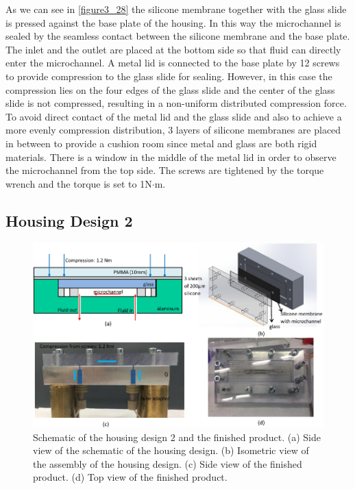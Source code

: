 As we can see in \autoref{figure3_28} the silicone membrane together with the glass slide is pressed against the base plate of the housing. In this way the microchannel is sealed by the seamless contact between the silicone membrane and the base plate. The inlet and the outlet are placed at the bottom side so that fluid can directly enter the microchannel. A metal lid is connected to the base plate by 12 screws to provide compression to the glass slide for sealing. However, in this case the compression lies on the four edges of the glass slide and the center of the glass slide is not compressed, resulting in a non-uniform distributed compression force. To avoid direct contact of the metal lid and the glass slide and also to achieve a more evenly compression distribution, 3 layers of silicone membranes are placed in between to provide a cushion room since metal and glass are both rigid materials. There is a window in the middle of the metal lid in order to observe the microchannel from the top side. The screws are tightened by the torque wrench and the torque is set to 1N$\cdot$m.

\subsection{Housing Design 2}
\label{3_5_2}
\begin{figure}[t]%
\centering
\includegraphics[width=1\textwidth]{figures/designandfabrication/figure3_29}%
\caption{Schematic of the housing design 2 and the finished product. (a) Side view of the schematic of the housing design. (b) Isometric view of the assembly of the housing design. (c) Side view of the finished product. (d) Top view of the finished product.}%
\label{figure3_29}%
\end{figure}

